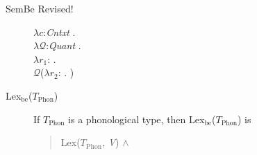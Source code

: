 \begin{description}
        

        
      \item[\textnormal{SemBe} Revised!] \mbox{}

        $\lambda c$:\textit{Cntxt} . \\
        \hspace*{1em}$\lambda\mathcal{Q}$:\textit{Quant} . \\
\hspace*{2em} $\lambda r_1$:
. \\
\hspace*{3em} $\mathcal{Q}$($\lambda
r_2$:
. )

\item[\textnormal{Lex$_{\mathrm{be}}$($T_{\mathrm{Phon}}$)}] \mbox{}

  If $T_{\mathrm{Phon}}$ is a phonological type, then
  Lex$_{\mathrm{be}}$($T_{\mathrm{Phon}}$) is
\begin{quote}
  Lex($T_{\mathrm{Phon}}$,
\textit{V}) \d{$\wedge$}
\end{quote}
  
        

  
  
\end{description}


